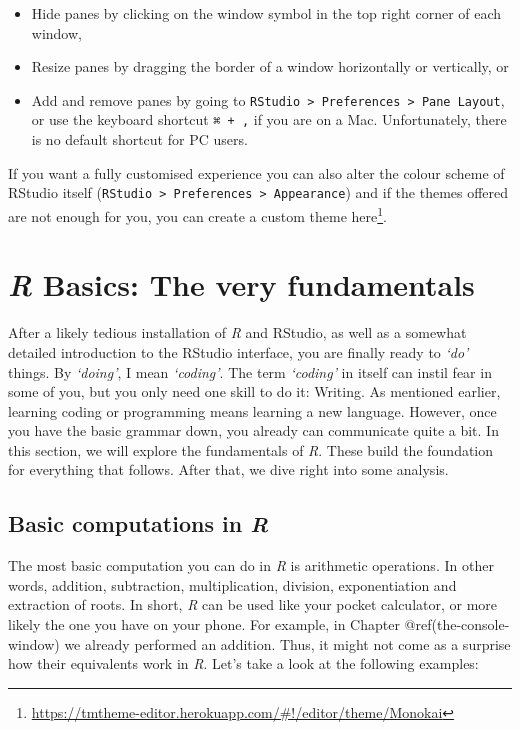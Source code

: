 \documentclass[
  letterpaper,
]{krantz}
\renewcommand{\href}[2]{#2\footnote{\url{#1}}}
\begin{document}
\begin{itemize}
\item
  Hide panes by clicking on the window symbol in the top right corner of
  each window,
\item
  Resize panes by dragging the border of a window horizontally or
  vertically, or
\item
  Add and remove panes by going to
  \texttt{RStudio\ \textgreater{}\ Preferences\ \textgreater{}\ Pane\ Layout},
  or use the keyboard shortcut \texttt{⌘\ +\ ,} if you are on a Mac.
  Unfortunately, there is no default shortcut for PC users.
\end{itemize}

If you want a fully customised experience you can also alter the colour
scheme of RStudio itself
(\texttt{RStudio\ \textgreater{}\ Preferences\ \textgreater{}\ Appearance})
and if the themes offered are not enough for you, you can create a
custom theme
\href{https://tmtheme-editor.herokuapp.com/\#!/editor/theme/Monokai}{here}.


\chapter{\texorpdfstring{\emph{R} Basics: The very
fundamentals}{R Basics: The very fundamentals}}\label{r-basics-the-very-fundamentals}

After a likely tedious installation of \emph{R} and RStudio, as well as
a somewhat detailed introduction to the RStudio interface, you are
finally ready to \emph{`do'} things. By \emph{`doing'}, I mean
\emph{`coding'}. The term \emph{`coding'} in itself can instil fear in
some of you, but you only need one skill to do it: Writing. As mentioned
earlier, learning coding or programming means learning a new language.
However, once you have the basic grammar down, you already can
communicate quite a bit. In this section, we will explore the
fundamentals of \emph{R}. These build the foundation for everything that
follows. After that, we dive right into some analysis.

\section{\texorpdfstring{Basic computations in
\emph{R}}{Basic computations in R}}\label{basic-computations-in-r}

The most basic computation you can do in \emph{R} is arithmetic
operations. In other words, addition, subtraction, multiplication,
division, exponentiation and extraction of roots. In short, \emph{R} can
be used like your pocket calculator, or more likely the one you have on
your phone. For example, in Chapter @ref(the-console-window) we already
performed an addition. Thus, it might not come as a surprise how their
equivalents work in \emph{R}. Let's take a look at the following
examples:
\end{document}

